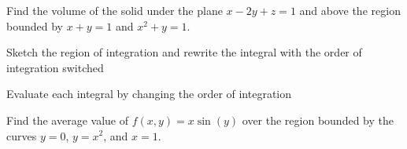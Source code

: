 \documentclass[12pt]{exam}
\begin{document}
\begin{questions}
\newpage

\question Find the volume of the solid under the plane \(x-2y+z=1\) and above the region bounded by \(x+y=1\) and \(x^2+y=1\).
    \ifprintanswers
        \begin{solution}
        \end{solution}
    \else
        \vfill
    \fi 

\question Sketch the region of integration and rewrite the integral with the order of integration switched

\newpage

\question Evaluate each integral by changing the order of integration

\question Find the average value of \(f(x,y)=x\sin (y)\) over the region bounded by the curves \(y=0\), \(y=x^2\), and \(x=1\).
    \ifprintanswers
        \begin{solution}
        \end{solution}
    \else
        \vfill
    \fi


\end{questions}
\end{document}
